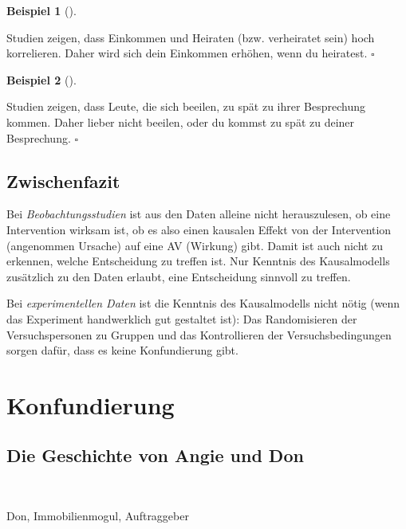 \documentclass[
  ngerman,
  letterpaper,
  twoside,
  open=any]{scrbook}
\theoremstyle{definition}
\newtheorem{example}{Beispiel}[chapter]
\theoremstyle{plain}
\theoremstyle{definition}
\theoremstyle{definition}
\theoremstyle{definition}
\newtheorem{example}{Beispiel}[chapter]
\theoremstyle{definition}
\theoremstyle{remark}
\begin{document}
\begin{example}[]\protect\hypertarget{exm-heiraten}{}\label{exm-heiraten}

Studien zeigen, dass Einkommen und Heiraten (bzw. verheiratet sein) hoch
korrelieren. Daher wird sich dein Einkommen erhöhen, wenn du heiratest.
\(\square\)

\end{example}

\begin{example}[]\protect\hypertarget{exm-besprechung}{}\label{exm-besprechung}

Studien zeigen, dass Leute, die sich beeilen, zu spät zu ihrer
Besprechung kommen. Daher lieber nicht beeilen, oder du kommst zu spät
zu deiner Besprechung. \(\square\)

\end{example}

\subsection{Zwischenfazit}\label{zwischenfazit}

Bei \emph{Beobachtungsstudien} ist aus den Daten alleine nicht
herauszulesen, ob eine Intervention wirksam ist, ob es also einen
kausalen Effekt von der Intervention (angenommen Ursache) auf eine AV
(Wirkung) gibt. Damit ist auch nicht zu erkennen, welche Entscheidung zu
treffen ist. Nur Kenntnis des Kausalmodells zusätzlich zu den Daten
erlaubt, eine Entscheidung sinnvoll zu treffen.

Bei \emph{experimentellen Daten} ist die Kenntnis des Kausalmodells
nicht nötig (wenn das Experiment handwerklich gut gestaltet ist): Das
Randomisieren der Versuchspersonen zu Gruppen und das Kontrollieren der
Versuchsbedingungen sorgen dafür, dass es keine Konfundierung gibt.

\section{Konfundierung}\label{konfundierung}

\subsection{Die Geschichte von Angie und
Don}\label{die-geschichte-von-angie-und-don}

🧑

Don, Immobilienmogul, Auftraggeber

👩
\end{document}
